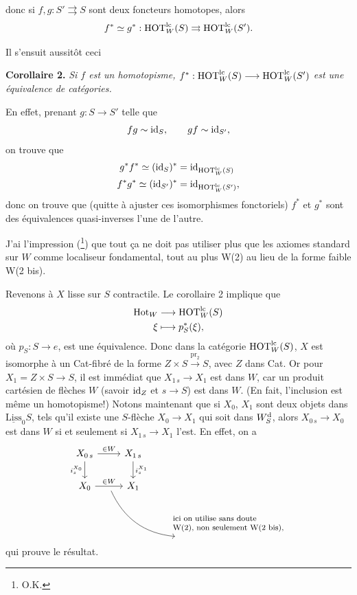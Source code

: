 donc si $f,g : S' \rightrightarrows S$ sont deux foncteurs homotopes, alors
\[ f^* \simeq g^* : \mathrm{HOT}^{\mathrm{lc}}_W(S) \rightrightarrows \mathrm{HOT}^{\mathrm{lc}}_W(S'). \]

Il s'ensuit aussitôt ceci

\textbf{Corollaire 2.} \textit{Si $f$ est un homotopisme, $f^* : \mathrm{HOT}^{\mathrm{lc}}_W(S) \longrightarrow \mathrm{HOT}^{\mathrm{lc}}_W(S')$ est une équivalence de catégories.}

En effet, prenant $g : S \longrightarrow S'$ telle que
\[ fg \sim \mathrm{id}_S, \qquad gf \sim \mathrm{id}_{S'}, \]
on trouve que
\[ \begin{aligned}
g^*f^* \simeq (\mathrm{id}_S)^* &= \mathrm{id}_{\mathrm{HOT}^{\mathrm{lc}}_W(S)} \\
f^*g^* \simeq (\mathrm{id}_{S'})^* &= \mathrm{id}_{\mathrm{HOT}^{\mathrm{lc}}_W(S')},
\end{aligned} \]
donc on trouve que (quitte à ajuster ces isomorphismes fonctoriels) $f^*$ et $g^*$ sont des équivalences quasi-inverses l'une de l'autre.

J'ai l'impression (\footnote[54]{O.K.}) que tout ça ne doit pas utiliser plus que les axiomes standard sur $W$ comme localiseur fondamental, tout au plus W(2) au lieu de la forme faible W(2 bis).

Revenons à $X$ lisse sur $S$ contractile. Le corollaire 2 implique que
\[ \begin{aligned}
\mathrm{Hot}_W &\longrightarrow \mathrm{HOT}^{\mathrm{lc}}_W(S) \\
\xi &\longmapsto p^*_S(\xi),
\end{aligned} \]
où $p_S : S \longrightarrow e$, est une équivalence. Donc dans la catégorie $\mathrm{HOT}^{\mathrm{lc}}_W(S)$, $X$ est isomorphe  à un Cat-fibré de la forme $Z \times S \xrightarrow{\mathrm{pr}_2} S$, avec $Z$ dans Cat. Or pour $X_1 = Z \times S \longrightarrow S$, il est immédiat que $X_{1\,s} \longrightarrow X_1$ est dans $W$, car un produit cartésien de flèches $W$ (savoir $\mathrm{id}_Z$ et $s \longrightarrow S$) est dans $W$. (En fait, l'inclusion est même un homotopisme!) Notons maintenant que si $X_0$, $X_1$ sont deux objets dans $\underline{\mathrm{Liss}}_0S$, tels qu'il existe une $S$-flèche $X_0 \longrightarrow X_1$ qui soit dans $W^{\mathrm{d}}_S$, alors $X_{0\,s} \longrightarrow X_0$ est dans $W$ si et seulement si $X_{1\,s} \longrightarrow X_1$ l'est. En effet, on a
\[ \begin{tikzcd}
X_{0\,s} \arrow[r, "\in W"] \arrow[d, "i_s^{X_0}"'] & X_{1\,s} \arrow[d, "i_s^{X_1}"] & \\
X_0 \arrow[r, "\in W", ""{name=A, below}] & X_1 & \\
 & & \text{\footnotesize\begin{tabular}{@{}l@{}}ici on utilise sans doute\\ W(2), non seulement W(2 bis),\end{tabular}}
\arrow[from=A, to=3-3, bend right]
\end{tikzcd} \]
qui prouve le résultat.

